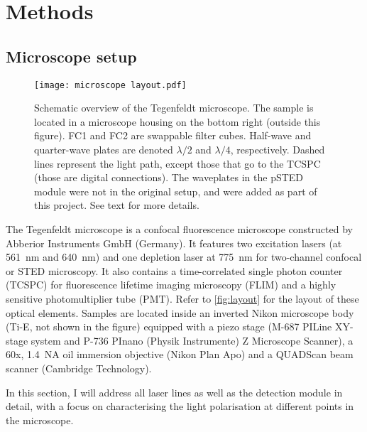 \chapter{Methods}

\section{Microscope setup}

\begin{figure}[bh]
	\centering
	\texttt{[image: microscope layout.pdf]}
	\caption{
		Schematic overview of the Tegenfeldt microscope. The sample is located in a microscope housing on the bottom right (outside this figure). FC1 and FC2 are swappable filter cubes. Half-wave and quarter-wave plates are denoted $ \lambda/2 $ and $ \lambda/4 $, respectively. Dashed lines represent the light path, except those that go to the TCSPC (those are digital connections). The waveplates in the pSTED module were not in the original setup, and were added as part of this project. See text for more details.
	}
	\label{fig:layout}
\end{figure}

The Tegenfeldt microscope is a confocal fluorescence microscope constructed by Abberior Instruments GmbH (Germany). It features two excitation lasers (at 561~nm and 640~nm) and one depletion laser at 775~nm for two-channel confocal or STED microscopy. It also contains a time-correlated single photon counter (TCSPC) for fluorescence lifetime imaging microscopy (FLIM) and a highly sensitive photomultiplier tube (PMT). Refer to \autoref{fig:layout} for the layout of these optical elements. Samples are located inside an inverted Nikon microscope body (Ti-E, not shown in the figure) equipped with a piezo stage (M-687 PILine XY-stage system and P-736 PInano (Physik Instrumente) Z Microscope Scanner), a 60x, 1.4~NA oil immersion objective (Nikon Plan Apo) and a QUADScan beam scanner (Cambridge Technology).


In this section, I will address all laser lines as well as the detection module in detail, with a focus on characterising the light polarisation at different points in the microscope.

